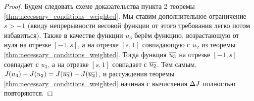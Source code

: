 \begin{proof}
Будем следовать схеме доказательства пункта 2 теоремы \ref{thm:necessary_conditions_weighted}.
Мы ставим дополнительное ограничение $s > -1$
(ввиду непрерывности весовой функции от этого требования легко потом избавиться).
Также в качестве функции $u_3$ берём функцию, возрастающую от нуля на отрезке $[-1, s]$,
а на отрезке $[s, 1]$ совпадающую с $u_2$ из теоремы \ref{thm:necessary_conditions_weighted}.
Тогда функция $\mon{u_3}$ на отрезке $[-1, s]$ совпадает с $u_3$, а на отрезке $[s, 1]$ совпадает с $\mon{u_2}$.
Тем самым, $\IWg(u_3) - \IWg(u_2) = \IWg(\mon{u_3}) - \IWg(\mon{u_2})$,
и рассуждения теоремы \ref{thm:necessary_conditions_weighted} начиная с вычисления $\Delta J$ полностью повторяются.
\end{proof}
